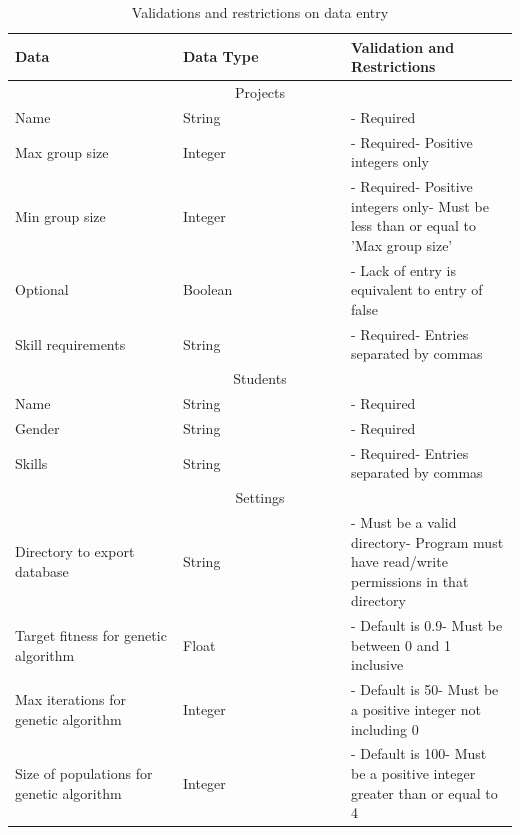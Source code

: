 \documentclass{article}
\begin{document}
\begin{longtable}[c]{|m{0.3333\linewidth}|m{0.3333\linewidth}|m{0.3333\linewidth}|}
    \caption{Validations and restrictions on data entry} \label{tab:dataEntry} \\
    \hline
    Data&Data Type&Validation and Restrictions\\
    \hline
    \multicolumn{3}{|c|}{Projects}\\
    \hline
    Name&String&- Required\\
    \hline
    Max group size&Integer&- Required\newline- Positive integers only\\
    \hline
    Min group size&Integer&- Required\newline- Positive integers only\newline- Must be less than or equal to 'Max group size'\\
    \hline
    Optional&Boolean&- Lack of entry is equivalent to entry of false\\
    \hline
    Skill requirements&String&- Required\newline- Entries separated by commas\\
    \hline
    \multicolumn{3}{|c|}{Students}\\
    \hline
    Name&String&- Required\\
    \hline
    Gender&String&- Required\\
    \hline
    Skills&String&- Required\newline- Entries separated by commas\\
    \hline
    \multicolumn{3}{|c|}{Settings}\\
    \hline
    Directory to export database&String&- Must be a valid directory\newline- Program must have read/write permissions in that directory\\
    \hline
    Target fitness for genetic algorithm&Float&- Default is 0.9\newline- Must be between 0 and 1 inclusive\\
    \hline
    Max iterations for genetic algorithm&Integer&- Default is 50\newline- Must be a positive integer not including 0\\
    \hline
    Size of populations for genetic algorithm&Integer&- Default is 100\newline- Must be a positive integer greater than or equal to 4\\
    \hline

\end{longtable}
\end{document}
